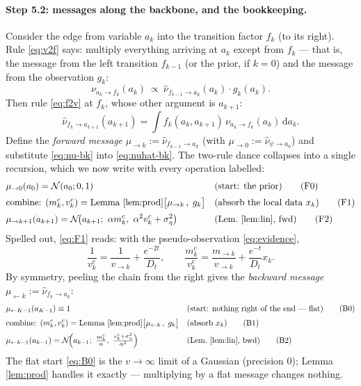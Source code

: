 \documentclass[11pt]{article}
\theoremstyle{definition}
\theoremstyle{remark}
\newcommand{\N}{\mathcal{N}}
\newcommand{\dd}{\mathrm{d}}
\begin{document}
\paragraph{Step 5.2: messages along the backbone, and the bookkeeping.}
Consider the edge from variable $a_k$ into the transition factor $f_k$ (to
its right). Rule \eqref{eq:v2f} says: multiply everything arriving at $a_k$
except from $f_k$ --- that is, the message from the left transition
$f_{k-1}$ (or the prior, if $k=0$) and the message from the observation
$g_k$:
\begin{equation}\label{eq:nu-bk}
  \nu_{a_k\to f_k}(a_k)\ \propto\
  \hat\nu_{f_{k-1}\to a_k}(a_k)\cdot g_k(a_k) .
\end{equation}
Then rule \eqref{eq:f2v} at $f_k$, whose other argument is $a_{k+1}$:
\begin{equation}\label{eq:nuhat-bk}
  \hat\nu_{f_k\to a_{k+1}}(a_{k+1})
  =\int f_k(a_k,a_{k+1})\,\nu_{a_k\to f_k}(a_k)\,\dd a_k .
\end{equation}
Define the \emph{forward message}
$\mu_{\to k}:=\hat\nu_{f_{k-1}\to a_k}$ (with
$\mu_{\to0}:=\hat\nu_{\psi\to a_0}$) and substitute \eqref{eq:nu-bk} into
\eqref{eq:nuhat-bk}. The two-rule dance collapses into a single recursion,
which we now write with every operation labelled:
\begin{align}
  &\mu_{\to0}(a_0)=\N(a_0;0,1)
  &&\text{(start: the prior)}
  \tag{F0}\label{eq:F0}\\[2pt]
  &\text{combine: }(m^c_k,v^c_k)
  =\text{Lemma \ref{lem:prod}}\big[\mu_{\to k}\,,\;g_k\big]
  &&\text{(absorb the local data $x_k$)}
  \tag{F1}\label{eq:F1}\\[2pt]
  &\mu_{\to k+1}(a_{k+1})
  =\N\!\big(a_{k+1};\ \alpha m^c_k,\ \alpha^2v^c_k+\sigma_\eta^2\big)
  &&\text{(Lem.~\ref{lem:lin}, fwd)}
  \tag{F2}\label{eq:F2}
\end{align}
Spelled out, \eqref{eq:F1} reads: with the pseudo-observation
\eqref{eq:evidence},
\[
  \frac1{v^c_k}=\frac1{v_{\to k}}+\frac{e^{-2t}}{D_t},
  \qquad
  \frac{m^c_k}{v^c_k}=\frac{m_{\to k}}{v_{\to k}}+\frac{e^{-t}}{D_t}x_k .
\]
By symmetry, peeling the chain from the right gives the \emph{backward
message} $\mu_{\leftarrow k}:=\hat\nu_{f_k\to a_k}$:
\begin{align}
  &\mu_{\leftarrow K-1}(a_{K-1})\equiv1
  &&\text{(start: nothing right of the end --- flat)}
  \tag{B0}\label{eq:B0}\\[2pt]
  &\text{combine: }(m^c_k,v^c_k)
  =\text{Lemma \ref{lem:prod}}\big[\mu_{\leftarrow k}\,,\;g_k\big]
  &&\text{(absorb $x_k$)}
  \tag{B1}\label{eq:B1}\\[2pt]
  &\mu_{\leftarrow k-1}(a_{k-1})
  =\N\!\Big(a_{k-1};\ \tfrac{m^c_k}{\alpha},\
  \tfrac{v^c_k+\sigma_\eta^2}{\alpha^2}\Big)
  &&\text{(Lem.~\ref{lem:lin}, bwd)}
  \tag{B2}\label{eq:B2}
\end{align}
The flat start \eqref{eq:B0} is the $v\to\infty$ limit of a Gaussian
(precision $0$); Lemma \ref{lem:prod} handles it exactly --- multiplying by
a flat message changes nothing.
\end{document}
